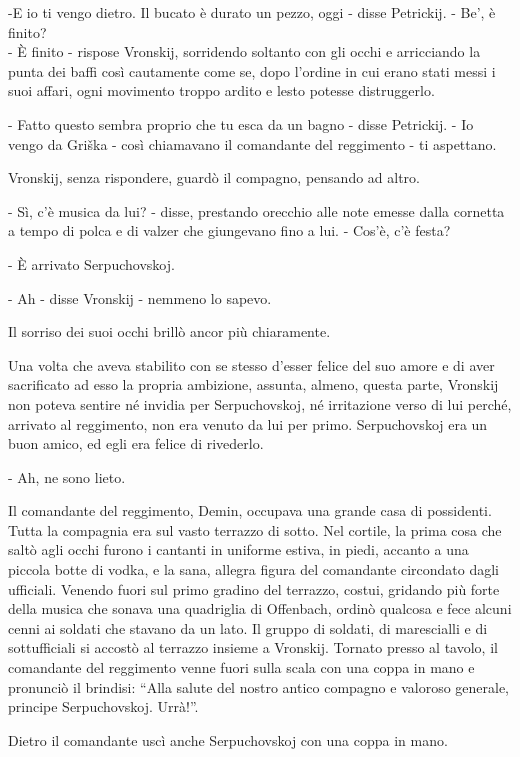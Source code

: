 -E io ti vengo dietro. Il bucato è durato un pezzo, oggi - disse Petrickij. - Be', è finito? \\
- È finito - rispose Vronskij, sorridendo soltanto con gli occhi e arricciando la punta dei baffi così cautamente come se, dopo l'ordine in cui erano stati messi i suoi affari, ogni movimento troppo ardito e lesto potesse distruggerlo. 

- Fatto questo sembra proprio che tu esca da un bagno - disse Petrickij. - Io vengo da Griška - così chiamavano il comandante del reggimento - ti aspettano. 

Vronskij, senza rispondere, guardò il compagno, pensando ad altro. 

- Sì, c'è musica da lui? - disse, prestando orecchio alle note emesse dalla cornetta a tempo di polca e di valzer che giungevano fino a lui. - Cos'è, c'è festa? 

- È arrivato Serpuchovskoj. 

- Ah - disse Vronskij - nemmeno lo sapevo. 

Il sorriso dei suoi occhi brillò ancor più chiaramente. 

Una volta che aveva stabilito con se stesso d'esser felice del suo amore e di aver sacrificato ad esso la propria ambizione, assunta, almeno, questa parte, Vronskij non poteva sentire né invidia per Serpuchovskoj, né irritazione verso di lui perché, arrivato al reggimento, non era venuto da lui per primo. Serpuchovskoj era un buon amico, ed egli era felice di rivederlo. 

- Ah, ne sono lieto. 

Il comandante del reggimento, Demin, occupava una grande casa di possidenti. Tutta la compagnia era sul vasto terrazzo di sotto. Nel cortile, la prima cosa che saltò agli occhi furono i cantanti in uniforme estiva, in piedi, accanto a una piccola botte di vodka, e la sana, allegra figura del comandante circondato dagli ufficiali. Venendo fuori sul primo gradino del terrazzo, costui, gridando più forte della musica che sonava una quadriglia di Offenbach, ordinò qualcosa e fece alcuni cenni ai soldati che stavano da un lato. Il gruppo di soldati, di marescialli e di sottufficiali si accostò al terrazzo insieme a Vronskij. Tornato presso al tavolo, il comandante del reggimento venne fuori sulla scala con una coppa in mano e pronunciò il brindisi: ``Alla salute del nostro antico compagno e valoroso generale, principe Serpuchovskoj. Urrà!''. 

Dietro il comandante uscì anche Serpuchovskoj con una coppa in mano. 

